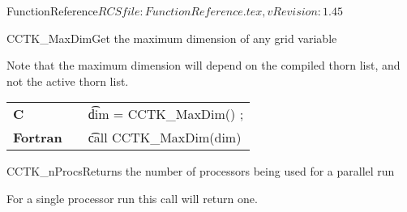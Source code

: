 \begin{cactuspart}{5}{FunctionReference}{$RCSfile: FunctionReference.tex,v $}{$Revision: 1.45 $}
\begin{CCTKFunc}{CCTK\_MaxDim}{Get the maximum dimension of any grid variable }
\label{CCTK-MaxDim}
\showargs
\begin{params}
\end{params}
\begin{discussion}
Note that the maximum dimension will depend on the compiled thorn list,
and not the active thorn list.
\end{discussion}
\begin{examples}
\begin{tabular}{@{}p{3cm}cp{11cm}}
\hfill {\bf C} && {\t dim = CCTK\_MaxDim() };
\\
\hfill {\bf Fortran} && {\t call  CCTK\_MaxDim(dim)}
\\
\end{tabular}
\end{examples}
\begin{errorcodes}
\end{errorcodes}
\end{CCTKFunc}





\begin{CCTKFunc}{CCTK\_nProcs}{Returns the number of processors being used for a parallel run}
\label{CCTK-nProcs}
\showargs
\begin{params}
\end{params}
\begin{discussion}
For a single processor run this call will return one.
\end{discussion}
\begin{examples}
\begin{tabular}{@{}p{3cm}cp{11cm}}
\end{tabular}
\end{examples}
\begin{errorcodes}
\end{errorcodes}
\end{CCTKFunc}




\end{cactuspart}
